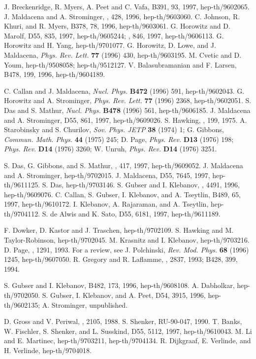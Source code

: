 \begin{thebibliography}{99}
 J. Breckenridge, R. Myers, A. Peet and C. Vafa,
\pl B391, 93, 1997, hep-th/9602065.
 J. Maldacena and A. Strominger, , 428, 1996,
hep-th/9603060.
 C. Johnson, R. Khuri, and R. Myers, \pl B378, 78, 1996,
hep-th/9603061.
 G. Horowitz and D. Marolf, \pr D55, 835, 1997, hep-th/9605244;
, 846, 1997, hep-th/9606113.
 G. Horowitz and H. Yang, hep-th/9701077.
 G. Horowitz, D. Lowe, and  J. Maldacena, {\sl Phys. Rev. Lett.}
{\bf 77} (1996) 430, hep-th/9603195.
 M. Cvetic and D. Youm, hep-th/9508058; hep-th/9512127.
 V. Balasubramanian and F. Larsen, \np B478, 199, 1996,
hep-th/9604189.

 C. Callan and J. Maldacena, {\sl Nucl. Phys.}
{\bf B472} (1996) 591,
hep-th/9602043.
 G. Horowitz and A. Strominger, {\sl Phys. Rev. Lett.} {\bf 77} 
(1996) 2368, hep-th/9602051.
 S. Das and S. Mathur, {\sl Nucl. Phys.} {\bf B478} (1996) 561,
hep-th/9606185. 
 J. Maldacena and A. Strominger, \pr D55, 861, 1997,
hep-th/9609026.
 S. Hawking, , 199, 1975.
 A. Starobinsky and S. Churilov,
{\sl Sov. Phys. JETP} {\bf 38} (1974) 1;
 G. Gibbons, {\sl Commun. Math. Phys.} {\bf 44} (1975) 245;
 D. Page, {\sl Phys. Rev.} {\bf D13} (1976) 198; {\sl Phys. Rev.}
{\bf D14} (1976) 3260;
 W. Unruh, {\sl Phys. Rev.} {\bf D14} (1976) 3251.

 S. Das, G. Gibbons, and S. Mathur, ,
417, 1997, hep-th/9609052.
 J. Maldacena and A. Strominger, hep-th/9702015.
 J. Maldacena, \pr D55, 7645, 1997, hep-th/9611125.
 S. Das, hep-th/9703146.
 S. Gubser and I. Klebanov, , 4491, 1996, hep-th/9609076.
 C. Callan, S. Gubser, I. Klebanov, and A. Tseytlin,
\np B489, 65, 1997, hep-th/9610172.
 I. Klebanov, A. Rajaraman, and A. Tseytlin, hep-th/9704112.
 S. de Alwis and K. Sato, \pr D55, 6181, 1997, hep-th/9611189.

 F. Dowker, D. Kastor and J. Traschen, hep-th/9702109.
 S. Hawking and M. Taylor-Robinson, hep-th/9702045.
  M. Krasnitz and I. Klebanov, hep-th/9703216.
 D. Page, , 1291, 1993.
 For a review, see
J. Polchinski, {\sl Rev. Mod. Phys.} {\bf 68} (1996) 1245,
hep-th/9607050.
 R. Gregory and R. Laflamme, ,
2837, 1993; \np B428, 399, 1994.

 S. Gubser and I. Klebanov, \np B482, 173, 1996, hep-th/9608108.
 A. Dabholkar, hep-th/9702050.
 S. Gubser, I. Klebanov, and A. Peet, \pr D54, 3915, 1996,
hep-th/9602135; A. Strominger, unpublished.

 D. Gross and V. Periwal, , 2105, 1988.
 S. Shenker, RU-90-047, 1990.
 T. Banks, W. Fischler, S. Shenker, and L. Susskind,
\pr D55, 5112, 1997, hep-th/9610043.
 M. Li and E. Martinec, hep-th/9703211, hep-th/9704134.
 R. Dijkgraaf, E. Verlinde, and H. Verlinde, hep-th/9704018.
\end{thebibliography}


